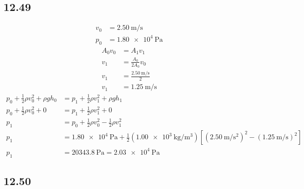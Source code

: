 \documentclass{article}
\begin{document}
\subsection{12.49}

\begin{align*}
	v_0 & = \SI{2.50}{\meter \per \second} \\
	p_0 & = \SI{1.80e4}{\pascal}
\end{align*}
\begin{align*}
	A_0v_0 & = A_1v_1 \\
	v_1 & = \frac{ A_0 }{ 2A_0 }v_0 \\
	v_1 & = \frac{ \SI{2.50}{\meter \per \second} }{ 2 } \\
	v_1 & = \SI{1.25}{\meter \per \second}
\end{align*}
\begin{align*}
	p_0 + \frac{1}{2}\rho v_0^2 + \rho gh_0 & = p_1 + \frac{1}{2}\rho v_1^2 + \rho gh_1 \\
	p_0 + \frac{1}{2}\rho v_0^2 + 0 & = p_1 + \frac{1}{2}\rho v_1^2 + 0 \\
	p_1 & = p_0 + \frac{1}{2}\rho v_0^2 - \frac{1}{2}\rho v_1^2 \\
	p_1 & = \SI{1.80e4}{\pascal} + \frac{1}{2}(\SI{1.00e3}{\kilogram \per \meter \cubed}) \left[ (\SI{2.50}{\meter \per \second \squared})^2 - (\SI{1.25}{\meter \per \second})^2 \right] \\
	p_1 & = \SI{20343.8}{\pascal} = \SI{2.03e4}{\pascal}
\end{align*}

\subsection{12.50}
\end{document}
